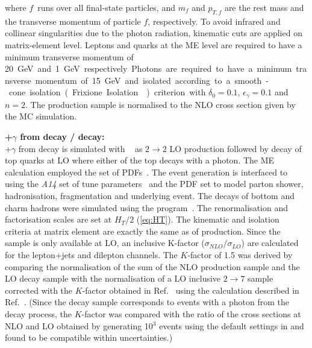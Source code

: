 where $f$~runs over all final-state particles, and $m_f$ and $p_{T,f}$ are the rest mass and the transverse momentum of particle $f$, respectively. To avoid infrared and collinear singularities due to the photon radiation, kinematic cuts are applied on matrix-element level. Leptons and quarks at the ME level are required to have a minimum transverse momentum of \SI{20} GeV and \SI{1} GeV respectively. Photons are required to have a minimum transverse momentum of 15 GeV and isolated according to a smooth-cone isolation (Frixione Isolation~\cite{Frixione:1998jh}) criterion with $\delta_0=0.1$, $\epsilon_{\gamma}=0.1$ and $n=2$. The \tty production sample is normalised to the NLO cross section given by the MC simulation.

\textbf{\ttbar+$\gamma$ from decay / \tty decay:}\\
\ttbar+$\gamma$ from decay is simulated with \MGNLO[2.7.3]~\cite{Alwall:2014hca} as $2 \to 2$ LO \ttbar production followed by decay of top quarks at LO where either of the top decays with a photon. The ME calculation employed the \NNPDF[3.0nlo] set of PDFs~\cite{Ball:2014uwa}. The event generation is interfaced to \PYTHIA[8.240]~\cite{Sjostrand:2007gs} using the \emph{A14} set of tune parameters~\cite{ATL-PHYS-PUB-2014-021} and the \nnpdflo PDF set to model parton shower, hadronisation, fragmentation and underlying event. The decays of bottom and charm hadrons were simulated using the \EVTGEN[1.6.0] program~\cite{Lange:2001uf}. The renormalisation and factorisation scales are set at $H_{T}/2$ (\cref{eq:HT}). The kinematic and isolation criteria at matrix element are exactly the same as of \tty production. Since the sample is only available at LO, an inclusive K-factor ($\sigma_{NLO}/\sigma_{LO}$) are calculated for the lepton+jets and dilepton channels. The $K$-factor of 1.5 was derived by comparing the normalisation of the sum of the NLO \tty production sample and the LO \tty decay sample with the normalisation of a LO inclusive $2 \to 7$ \tty sample corrected with the $K$-factor obtained in Ref.~\cite{TOPQ-2017-14} using the calculation described in Ref.~\cite{Melnikov:2011ta}. (Since the \tty decay sample corresponds to \ttbar events with a photon from the decay process, the $K$-factor was compared with the ratio of the \ttbar cross sections at NLO and LO obtained by generating 10$^3$ events using the default settings in \MGNLO and found to be compatible within uncertainties.)


